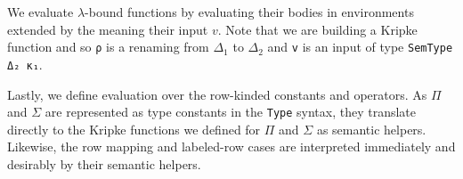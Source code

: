 \documentclass[authoryear, acmsmall, screen, review, nonacm]{acmart}
\begin{document}
\begin{code}%
\>[0]\AgdaSpace{}%
\AgdaSymbol{\{}\AgdaSpace{}%
\AgdaSymbol{=}\AgdaSpace{}%
\AgdaSymbol{\}}\AgdaSpace{}%
\AgdaSymbol{(}\AgdaSpace{}%
\AgdaSymbol{)}\AgdaSpace{}%
\AgdaSpace{}%
\AgdaSymbol{=}\AgdaSpace{}%
\AgdaSpace{}%
\<%
\end{code}


\Ni We evaluate $\lambda$-bound functions by evaluating their bodies in environments extended by the meaning their input $v$. Note that we are building a Kripke function and so \verb!ρ! is a renaming from $\Delta_1$ to $\Delta_2$ and \verb!v! is an input of type \verb!SemType Δ₂ κ₁!.

\begin{code}%
\>[0]\AgdaSpace{}%
\AgdaSymbol{\{}\AgdaSpace{}%
\AgdaSymbol{=}\AgdaSpace{}%
\AgdaSpace{}%
\AgdaSpace{}%
\AgdaSymbol{\}}\AgdaSpace{}%
\AgdaSymbol{(}\AgdaSpace{}%
\AgdaSymbol{)}\AgdaSpace{}%
\AgdaSpace{}%
\AgdaSymbol{=}\AgdaSpace{}%
\AgdaSpace{}%
\AgdaSpace{}%
\AgdaSpace{}%
\AgdaSpace{}%
\AgdaSpace{}%
\AgdaSpace{}%
\AgdaSymbol{(}\AgdaSpace{}%
\AgdaSpace{}%
\AgdaSymbol{\{}\AgdaSymbol{\}}\AgdaSpace{}%
\AgdaSpace{}%
\AgdaSpace{}%
\AgdaSpace{}%
\AgdaSymbol{\{}\AgdaSpace{}%
\AgdaSymbol{=}\AgdaSpace{}%
\AgdaSymbol{\}}\AgdaSpace{}%
\AgdaSpace{}%
\AgdaSymbol{(}\AgdaSpace{}%
\AgdaSymbol{))}\AgdaSpace{}%
\AgdaSymbol{)}\<%
\end{code}

\Ni Lastly, we define evaluation over the row-kinded constants and operators. As $\Pi$ and $\Sigma$ are represented as type constants in the \verb!Type! syntax, they translate directly to the Kripke functions we defined for $\Pi$ and $\Sigma$ as semantic helpers. Likewise, the row mapping and labeled-row cases are interpreted immediately and desirably by their semantic helpers.
\end{document}
